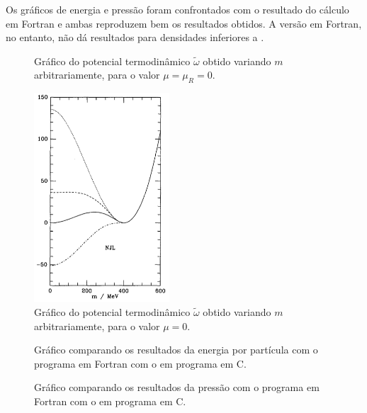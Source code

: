 \begin{enumerate}
\begin{description}
	Os gráficos de energia e pressão foram confrontados com o resultado do cálculo em Fortran e ambas reproduzem bem os resultados obtidos. A versão em Fortran, no entanto, não dá resultados para densidades inferiores a .
\end{description}   


\begin{figure}
	
	\caption{Gráfico do potencial termodinâmico $\tilde{\omega}$ obtido variando $m$ arbitrariamente, para o valor $\mu = \mu_R = 0$. \protect}
	\label{Fig:pot_term_analysys_NJL-Buballa_Set_1}
\end{figure}

\begin{figure}
	\includegraphics[width=0.45\textwidth]{graphics/Therm_pot_analysis/Pot_buballa.png}
	\caption{Gráfico do potencial termodinâmico $\tilde{\omega}$ obtido variando $m$ arbitrariamente, para o valor $\mu = 0$.}
	\label{Fig:pot_term_analysys_Buballa_NJL-Buballa_Set_1}
\end{figure}

\begin{figure}
	
	\caption{Gráfico comparando os resultados da energia por partícula com o programa em Fortran com o em programa em C. \protect}
	\label{Fig:energy_Comp_C_F}
\end{figure}

\begin{figure}
	
	\caption{Gráfico comparando os resultados da pressão com o programa em Fortran com o em programa em C. \protect}
	\label{Fig:pressure_Comp_C_F}
\end{figure}


\end{enumerate}
